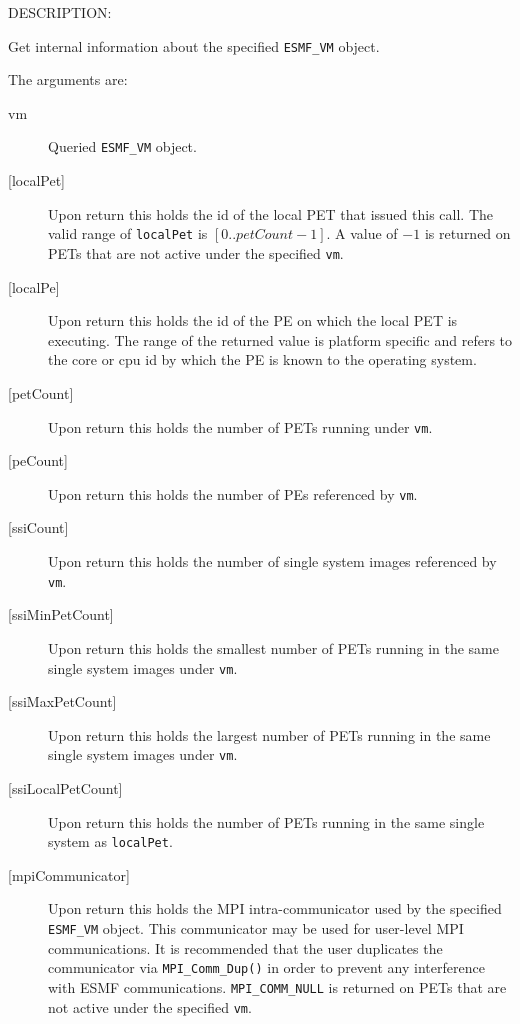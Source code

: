 {\sf DESCRIPTION:\\ }


     Get internal information about the specified {\tt ESMF\_VM} object.
  
     The arguments are:
     \begin{description}
     \item[vm] 
          Queried {\tt ESMF\_VM} object.
     \item[{[localPet]}]
          Upon return this holds the id of the local PET that issued this call.
          The valid range of {\tt localPet} is $[0..petCount-1]$. A value of $-1$
          is returned on PETs that are not active under the specified {\tt vm}.
     \item[{[localPe]}]
          Upon return this holds the id of the PE on which the local PET is
          executing. The range of the returned value is platform specific and
          refers to the core or cpu id by which the PE is known to the operating
          system.
     \item[{[petCount]}]
          Upon return this holds the number of PETs running under {\tt vm}.
     \item[{[peCount]}]
          Upon return this holds the number of PEs referenced by {\tt vm}.
     \item[{[ssiCount]}]
          Upon return this holds the number of single system images referenced 
          by {\tt vm}.
     \item[{[ssiMinPetCount]}]
          Upon return this holds the smallest number of PETs running in the same
          single system images under {\tt vm}.
     \item[{[ssiMaxPetCount]}]
          Upon return this holds the largest number of PETs running in the same
          single system images under {\tt vm}.
     \item[{[ssiLocalPetCount]}]
          Upon return this holds the number of PETs running in the same
          single system as {\tt localPet}.
     \item[{[mpiCommunicator]}]
          Upon return this holds the MPI intra-communicator used by the 
          specified {\tt ESMF\_VM} object. This communicator may be used for
          user-level MPI communications. It is recommended that the user
          duplicates the communicator via {\tt MPI\_Comm\_Dup()} in order to
          prevent any interference with ESMF communications.
          {\tt MPI\_COMM\_NULL} is returned on PETs that are not active
          under the specified {\tt vm}.

\end{description}
